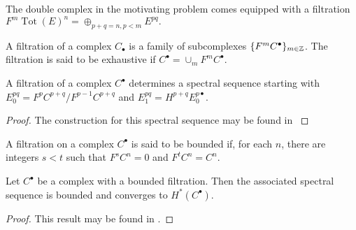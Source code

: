 The double complex in the motivating problem comes equipped with a filtration $F^{m} \operatorname{Tot}(E)^n = \oplus_{p+q = n, p <m} E^{pq}.$
\begin{definition}
  A filtration of a complex $C_\bullet$ is a family of subcomplexes $\{F^m C^\bullet\}_{m\in \mathbb{Z}}$.
  The filtration is said to be exhaustive if $C^\bullet = \cup_m F^mC^\bullet$.
\end{definition}
\begin{proposition}
 A filtration of a complex $C^\bullet$ determines a spectral sequence starting with $E^{pq}_0 = F^p C^{p+q}/F^{p-1}C^{p+q}$ and $E^{pq}_1= H^{p+q} E^{p\bullet}_0$.
\end{proposition}
\begin{proof}
  The construction for this spectral sequence may be found in \cite[Chapter 5]{weibel1995introduction}
\end{proof}
\begin{definition}
  A filtration on a complex $C^\bullet$ is said to be bounded
 if, for each $n$, there are integers $s<t$ such that $F^s C^n = 0$ and $F^t C^n = C^n$. \end{definition}
 \begin{proposition}
   Let $C^\bullet$ be a complex with a bounded filtration. Then the associated spectral sequence is bounded and converges to $H^*(C^\bullet)$.
 \end{proposition}
 \begin{proof}
   This result may be found in \cite[Chapter 5]{weibel1995introduction}.
 \end{proof}
